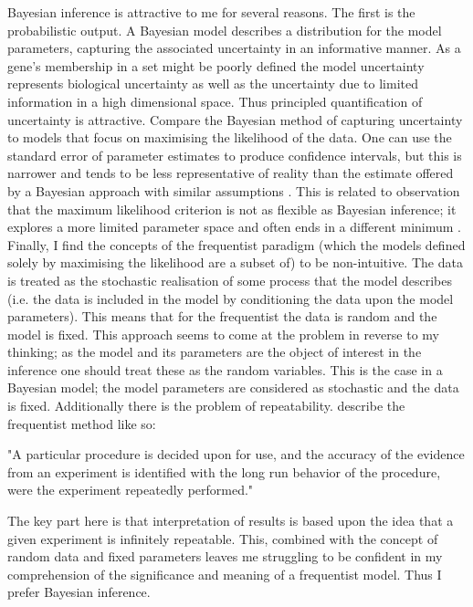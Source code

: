 \documentclass[14pt]{extarticle} %
\begin{document}
	Bayesian inference is attractive to me for several reasons. The first is the probabilistic output. A Bayesian model describes a distribution for the model parameters, capturing the associated uncertainty in an informative manner. As a gene's membership in a set might be poorly defined \citep{Pita-JuarezPathwayCoexpressionNetwork2018} the model uncertainty represents biological uncertainty as well as the uncertainty due to limited information in a high dimensional space. Thus principled quantification of uncertainty is attractive. Compare the Bayesian method of capturing uncertainty to models that focus on maximising the likelihood of the data. One can use the standard error of parameter estimates to produce confidence intervals, but this is narrower and tends to be less representative of reality than the estimate offered by a Bayesian approach with similar assumptions \citep{PhysRevLett.122.232502}. This is related to observation that the maximum likelihood criterion is not as flexible as Bayesian inference; it explores a more limited parameter space and often ends in a different minimum \citep{PhysRevLett.122.232502, efron2013250}. Finally, I find the concepts of the frequentist paradigm (which the models defined solely by maximising the likelihood are a subset of) to be non-intuitive. The data is treated as the stochastic realisation of some process that the model describes (i.e. the data is included in the model by conditioning the data upon the model parameters). This means that for the frequentist the data is random and the model is fixed. This approach seems to come at the problem in reverse to my thinking; as the model and its parameters are the object of interest in the inference one should treat these as the random variables. This is the case in a Bayesian model; the model parameters are considered as stochastic and the data is fixed. Additionally there is the problem of repeatability. \citet[p.14]{berger1988thelikelihoodprinciple} describe the frequentist method like so:
	
	\begin{displayquote}
		"A particular procedure is decided upon for use, and the accuracy of the evidence from an experiment is identified with the long run behavior of the procedure, were the experiment repeatedly performed." 
	\end{displayquote}
	The key part here is that interpretation of results is based upon the idea that a given experiment is infinitely repeatable. This, combined with the concept of random data and fixed parameters leaves me struggling to be confident in my comprehension of the significance and meaning of a frequentist model. Thus I prefer Bayesian inference.
	
\end{document}
